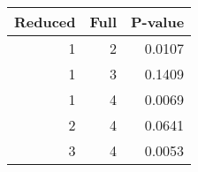 \begin{table}[ht]
\centering
\begin{tabular}{rrr}
  \hline
Reduced & Full & P-value \\ 
  \hline
1 & 2 & 0.0107 \\ 
  1 & 3 & 0.1409 \\ 
  1 & 4 & 0.0069 \\ 
  2 & 4 & 0.0641 \\ 
  3 & 4 & 0.0053 \\ 
   \hline
\end{tabular}
\end{table}
